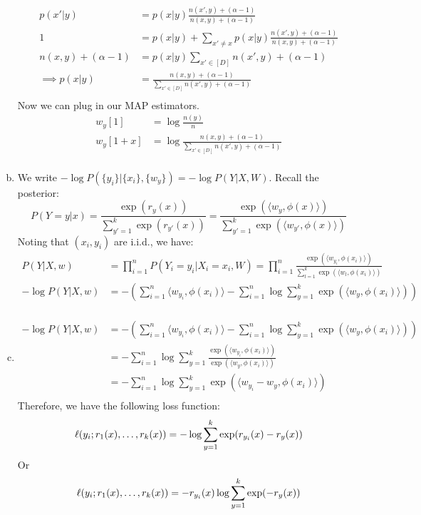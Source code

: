 \documentclass{amsart}
\theoremstyle{definition}
\begin{document}
\begin{enumerate}[(a)]
\begin{align*}
			p(x'|y) &= p(x|y)\frac{n(x',y) + (\alpha - 1)}{n(x,y) + (\alpha - 1)}\\
			1 &= p(x|y) + \sum_{x' \neq x} p(x|y)\frac{n(x',y) + (\alpha - 1)}{n(x,y) + (\alpha - 1)}\\
			n(x,y) + (\alpha - 1) &= p(x|y)\sum_{x' \in [D]} n(x',y) + (\alpha - 1)\\
			\implies p(x|y) &= \frac{n(x,y) + (\alpha - 1)}{\sum_{x' \in [D]} n(x',y) + (\alpha - 1)}\\
		\end{align*}
		Now we can plug in our MAP estimators.
		\begin{align*}
			w_y[1] &= \log\frac{n(y)}{n}\\
			w_y[1 + x] &= \log\frac{n(x,y) + (\alpha - 1)}{\sum_{x' \in [D]} n(x',y) + (\alpha - 1)}\\
		\end{align*}
	\item 
		We write $-\log P(\{y_i\}|\{x_i\}, \{w_y\}) = -\log P(Y|X, W)$. Recall the posterior:
		\[P(Y = y| x) = \frac{\exp(r_y(x))}{\sum_{y'=1}^{k}\exp(r_{y'}(x))}= \frac{\exp(\langle w_y, \phi(x)\rangle)}{\sum_{y'=1}^{k} \exp(\langle w_{y'}, \phi(x) \rangle)}\]
		Noting that $(x_i, y_i)$ are i.i.d., we have:
		\begin{align*}
			P(Y|X, w) &= \prod_{i=1}^{n} P(Y_i = y_i|X_i = x_i, W) = \prod_{i=1}^{n} \frac{\exp(\langle w_{y_i}, \phi(x_i)\rangle)}{\sum_{l=1}^{k} \exp(\langle w_l, \phi(x_i) \rangle)}\\
			-\log P(Y|X, w) &= -\left(\sum_{i=1}^{n}\langle w_{y_i}, \phi(x_i)\rangle  - \sum_{i=1}^{n} \log \sum_{y=1}^{k} \exp(\langle w_y, \phi(x_i)\rangle)\right)\\
		\end{align*}
	\item 
		\begin{align*}
			-\log P(Y|X, w) &= -\left(\sum_{i=1}^{n}\langle w_{y_i}, \phi(x_i)\rangle  - \sum_{i=1}^{n} \log \sum_{y=1}^{k} \exp(\langle w_y, \phi(x_i)\rangle)\right)\\
			&= -\sum_{i = 1}^{n} \log \sum_{y=1}^{k} \frac{\exp(\langle w_{y_i}, \phi(x_i)\rangle)}{\exp(\langle w_y, \phi (x_i)\rangle)}\\
			&= -\sum_{i = 1}^{n} \log \sum_{y=1}^{k} \exp(\langle w_{y_i} - w_{y}, \phi(x_i)\rangle)\\
		\end{align*}
		Therefore, we have the following loss function:
		\[
		\ell(y_i; r_1(x), \ldots, r_k(x))= -\log \sum_{y = 1}^{k} \exp(r_{y_i}(x) - r_{y}(x))\\
		\]
		Or 
		\[
		\ell(y_i; r_1(x), \ldots, r_k(x))= - r_{y_i}(x) \log\sum_{y = 1}^{k} \exp(-r_{y}(x))\\
		\]
\end{enumerate}
\end{document}
